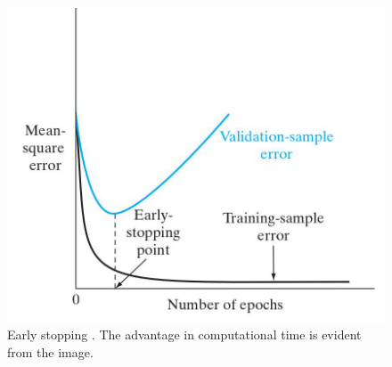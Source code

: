 \begin{figure}[!htb]
\centering
\includegraphics[width=.50\columnwidth]{images/123earlystopping}
\caption[Early stopping]{Early stopping
\cite{RefWorks:158}. The advantage in computational time is evident from the
image.}
\label{fig:123earlystopping}
\end{figure}